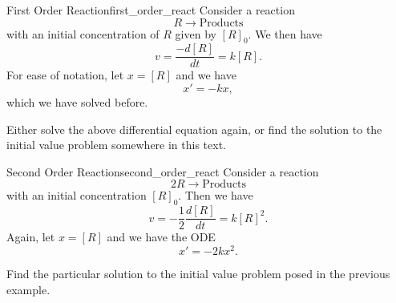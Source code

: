         \begin{ex}{First Order Reaction}{first_order_react}
        Consider a reaction
        \[
        R \to \textrm{Products}
        \]
        with an initial concentration of $R$ given by $[R]_0$. We then have
        \[
        v=\frac{-d[R]}{dt}=k[R].
        \]
        For ease of notation, let $x=[R]$ and we have
        \[
        x'=-kx,
        \]
        which we have solved before.
        \end{ex}
        
        \begin{exercise}
        Either solve the above differential equation again, or find the solution to the initial value problem somewhere in this text.
        \end{exercise}
        
        \begin{ex}{Second Order Reaction}{second_order_react}
        Consider a reaction
        \[
        2R \to \textrm{Products}
        \]
        with an initial concentration $[R]_0$.  Then we have
        \[
        v=-\frac{1}{2} \frac{d[R]}{dt}=k[R]^2.
        \]
        Again, let $x=[R]$ and we have the ODE
        \[
        x'=-2kx^2.
        \]
        \end{ex}
        
        \begin{exercise}
        Find the particular solution to the initial value problem posed in the previous example.
        \end{exercise}
        
